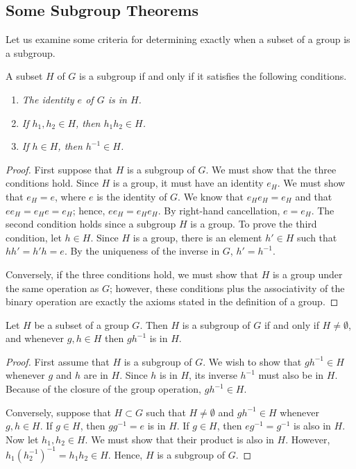  
\subsection*{Some Subgroup Theorems}
 
 
Let us examine some criteria for determining exactly when a subset of
a group is a subgroup.
 
 
\begin{proposition}
A subset $H$ of $G$ is a subgroup if and only if it satisfies the
following conditions. 
\begin{enumerate}
 
\rm \item \it 
The identity $e$ of $G$ is in $H$. 
 
\rm \item \it 
If $h_1, h_2 \in H$, then $h_1h_2 \in H$. 
 
\rm \item \it 
If $h \in H$, then $h^{-1} \in H$.
 
\end{enumerate}
\end{proposition}
 
 
\begin{proof}
First suppose that $H$ is a subgroup of $G$.  We must show that the three conditions hold.  Since $H$ is a group, it must have an identity $e_H$.  We must show that $e_H = e$, where $e$ is the identity of $G$. We know that $e_H e_H = e_H$ and that $ee_H = e_H e = e_H$; hence, $ee_H = e_H e_H$.  By right-hand cancellation, $e =e_H$.  The second condition holds since a subgroup $H$ is a group.  To prove the third condition, let $h \in H$.  Since $H$ is a group, there is  an element $h' \in H$ such that $hh' = h'h = e$.  By the uniqueness  of the inverse in $G$, $h' = h^{-1}$.

Conversely, if the three conditions hold, we must show that $H$ is a group under the same operation as $G$; however, these conditions plus the associativity of the binary operation are exactly the axioms stated in the definition of a group.
\end{proof}

\begin{proposition}\label{groups:subgroup_prop}
Let $H$ be a subset of a group $G$.  Then $H$ is a subgroup of $G$ if and only if $H \neq \emptyset$, and whenever $g, h \in H$ then $gh^{-1}$ is in $H$. 
\end{proposition}
 
 
\begin{proof}
First assume that $H$ is a subgroup of $G$.  We wish to show that $gh^{-1} \in H$ whenever $g$ and $h$ are in $H$.  Since $h$ is in $H$, its inverse $h^{-1}$ must also be in $H$.  Because of the closure of the group operation, $gh^{-1} \in H$. 

Conversely, suppose that $H \subset G$ such that $H \neq \emptyset$ and  $g h^{-1} \in H$ whenever $g, h \in H$.  If $g \in H$, then $gg^{-1} = e$ is in $H$.  If $g \in H$, then $eg^{-1} = g^{-1}$ is also in $H$. Now let $h_1, h_2 \in H$. We must show that their product is also in $H$.  However, $h_1(h_2^{-1})^{-1} = h_1 h_2 \in H$.  Hence, $H$ is a subgroup of $G$. 
\end{proof}

